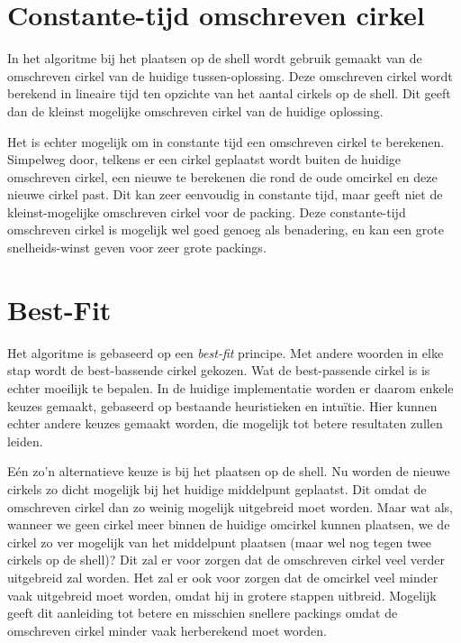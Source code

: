 \documentclass[12pt,a4paper,oneside]{book}
\begin{document}
\section{Constante-tijd omschreven cirkel}

In het algoritme bij het plaatsen op de shell wordt gebruik gemaakt van de omschreven cirkel van de huidige tussen-oplossing.
Deze omschreven cirkel wordt berekend in lineaire tijd ten opzichte van het aantal cirkels op de shell.
Dit geeft dan de kleinst mogelijke omschreven cirkel van de huidige oplossing.

Het is echter mogelijk om in constante tijd een omschreven cirkel te berekenen.
Simpelweg door, telkens er een cirkel geplaatst wordt buiten de huidige omschreven cirkel, een nieuwe te berekenen die rond de oude omcirkel en deze nieuwe cirkel past.
Dit kan zeer eenvoudig in constante tijd, maar geeft niet de kleinst-mogelijke omschreven cirkel voor de packing.
Deze constante-tijd omschreven cirkel is mogelijk wel goed genoeg als benadering, en kan een grote snelheids-winst geven voor zeer grote packings.

\section{Best-Fit}

Het algoritme is gebaseerd op een \textit{best-fit} principe.
Met andere woorden in elke stap wordt de best-bassende cirkel gekozen.
Wat de best-passende cirkel is is echter moeilijk te bepalen.
In de huidige implementatie worden er daarom enkele keuzes gemaakt, gebaseerd op bestaande heuristieken en intuïtie.
Hier kunnen echter andere keuzes gemaakt worden, die mogelijk tot betere resultaten zullen leiden.

Eén zo'n alternatieve keuze is bij het plaatsen op de shell.
Nu worden de nieuwe cirkels zo dicht mogelijk bij het huidige middelpunt geplaatst.
Dit omdat de omschreven cirkel dan zo weinig mogelijk uitgebreid moet worden.
Maar wat als, wanneer we geen cirkel meer binnen de huidige omcirkel kunnen plaatsen, we de cirkel zo ver mogelijk van het middelpunt plaatsen (maar wel nog tegen twee cirkels op de shell)?
Dit zal er voor zorgen dat de omschreven cirkel veel verder uitgebreid zal worden.
Het zal er ook voor zorgen dat de omcirkel veel minder vaak uitgebreid moet worden, omdat hij in grotere stappen uitbreid.
Mogelijk geeft dit aanleiding tot betere en misschien snellere packings omdat de omschreven cirkel minder vaak herberekend moet worden.
\end{document}
